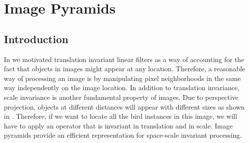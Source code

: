 
 \chapter{Image Pyramids}
 \label{chapter:image_pyramids}




%



\section{Introduction}

In \chap{\ref{chapter:linear_image_filtering}} we motivated translation invariant linear filters as a way of accounting for the fact that objects in images might appear at any location. Therefore, a reasonable way of processing an image is by manipulating pixel neighborhoods  in the same way independently on the image location. In addition to translation invariance, scale invariance is another fundamental property of images. Due to perspective projection, objects at different distances will appear with different sizes as shown in \fig{\ref{fig:birds_multiscale}}. Therefore, if we want to locate all the bird instances in this image, we will have to apply an operator that is invariant in translation and in scale. Image pyramids provide an efficient representation for space-scale invariant processing.



